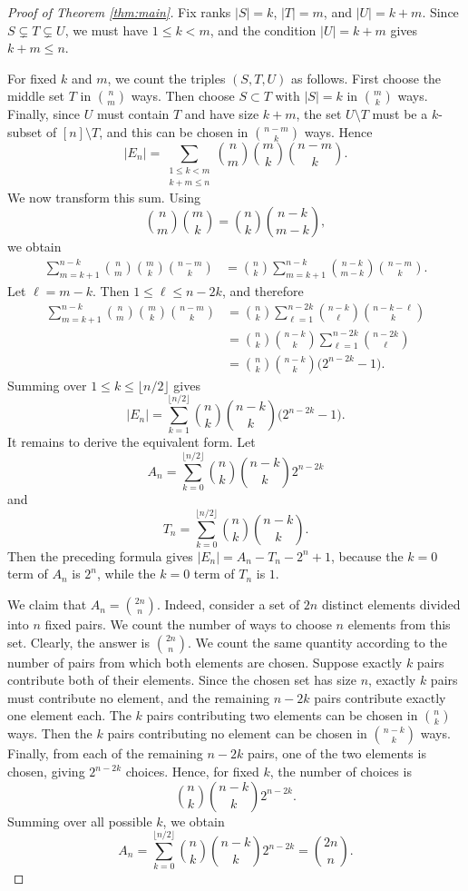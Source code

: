 \documentclass[twoside,12pt]{article}
\begin{document}
\begin{proof}[Proof of Theorem \ref{thm:main}]
Fix ranks $|S|=k$, $|T|=m$, and $|U|=k+m$. Since
$S\subsetneq T\subsetneq U$,
we must have $1\leq k<m$, and the condition $|U|=k+m$ gives $k+m\leq n$.

For fixed $k$ and $m$, we count the triples $(S,T,U)$ as follows. First choose the middle set $T$ in $\binom{n}{m}$ ways. Then choose $S\subset T$ with $|S|=k$ in $\binom{m}{k}$ ways. Finally, since $U$ must contain $T$ and have size $k+m$, the set $U\setminus T$ must be a $k$-subset of $[n]\setminus T$, and this can be chosen in $\binom{n-m}{k}$ ways. Hence
\[
|E_n|
=
\sum_{\substack{1\leq k<m\\ k+m\leq n}}
\binom{n}{m}\binom{m}{k}\binom{n-m}{k}.
\]
We now transform this sum. Using
\[
\binom{n}{m}\binom{m}{k}
=
\binom{n}{k}\binom{n-k}{m-k},
\]
we obtain
\begin{align*}
\sum_{m=k+1}^{n-k}\binom{n}{m}\binom{m}{k}\binom{n-m}{k}
&=
\binom{n}{k}
\sum_{m=k+1}^{n-k}
\binom{n-k}{m-k}\binom{n-m}{k}.
\end{align*}
Let $\ell=m-k$. Then $1\leq \ell\leq n-2k$, and therefore
\begin{align*}
\sum_{m=k+1}^{n-k}\binom{n}{m}\binom{m}{k}\binom{n-m}{k}
&=
\binom{n}{k}
\sum_{\ell=1}^{n-2k}
\binom{n-k}{\ell}\binom{n-k-\ell}{k}  \\
&=
\binom{n}{k}\binom{n-k}{k}
\sum_{\ell=1}^{n-2k}
\binom{n-2k}{\ell}  \\
&=
\binom{n}{k}\binom{n-k}{k}
\bigl(2^{n-2k}-1\bigr).
\end{align*}
Summing over $1\leq k\leq \lfloor n/2\rfloor$ gives
\[
|E_n|
=
\sum_{k=1}^{\lfloor n/2\rfloor}
\binom{n}{k}\binom{n-k}{k}
\bigl(2^{n-2k}-1\bigr).
\]
It remains to derive the equivalent form. Let
\[
A_n=
\sum_{k=0}^{\lfloor n/2\rfloor}
\binom{n}{k}\binom{n-k}{k}2^{n-2k}
\]
and
\[
T_n=
\sum_{k=0}^{\lfloor n/2\rfloor}
\binom{n}{k}\binom{n-k}{k}.
\]
Then the preceding formula gives
$|E_n|=A_n-T_n-2^n+1$,
because the $k=0$ term of $A_n$ is $2^n$, while the $k=0$ term of $T_n$ is $1$.

We claim that
$A_n=\binom{2n}{n}$.
Indeed, consider a set of \(2n\) distinct elements divided into \(n\) fixed
pairs. We count the number of ways to choose \(n\) elements from this set.
Clearly, the answer is \(\binom{2n}{n}\).
We count the same quantity according to the number of pairs from which both
elements are chosen. Suppose exactly \(k\) pairs contribute both of their
elements. Since the chosen set has size \(n\), exactly \(k\) pairs must
contribute no element, and the remaining \(n-2k\) pairs contribute exactly
one element each. The \(k\) pairs contributing two elements can be chosen in
\(\binom{n}{k}\) ways. Then the \(k\) pairs contributing no element can be
chosen in \(\binom{n-k}{k}\) ways. Finally, from each of the remaining
\(n-2k\) pairs, one of the two elements is chosen, giving \(2^{n-2k}\)
choices. Hence, for fixed \(k\), the number of choices is
\[
\binom{n}{k}\binom{n-k}{k}2^{n-2k}.
\]
Summing over all possible \(k\), we obtain
\[
A_n
=
\sum_{k=0}^{\lfloor n/2\rfloor}
\binom{n}{k}\binom{n-k}{k}2^{n-2k}
=
\binom{2n}{n}.
\]


\end{proof}
\end{document}
